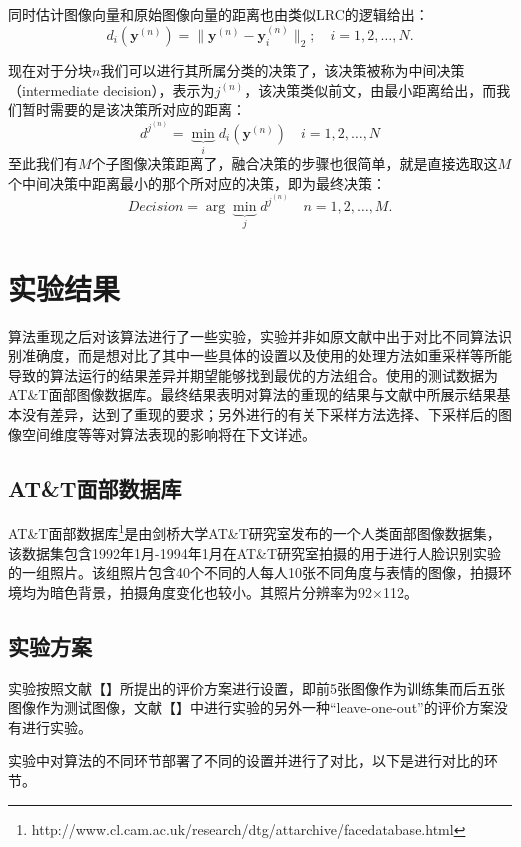 \documentclass[UTF8]{ctexart}
\begin{document}
\par
同时估计图像向量和原始图像向量的距离也由类似LRC的逻辑给出：
\begin{equation}
    d_i(\mathbf{y}^{(n)})=\|\mathbf{y}^{(n)}-\mathbf{y}^{(n)}_i\|_2;\quad i=1,2,\dots,N.
\end{equation}
\par
现在对于分块\(n\)我们可以进行其所属分类的决策了，该决策被称为中间决策（intermediate decision），表示为\(j^{(n)}\)，该决策类似前文，由最小距离给出，而我们暂时需要的是该决策所对应的距离：
\begin{equation}
    d^{j^{(n)}}=\underbrace{\min}_i d_i(\mathbf{y}^{(n)})\quad i=1,2,\dots,N
\end{equation}
至此我们有\(M\)个子图像决策距离了，融合决策的步骤也很简单，就是直接选取这\(M\)个中间决策中距离最小的那个所对应的决策，即为最终决策：
\begin{equation}
    Decision=\arg{\underbrace{\min}_j}d^{j^{(n)}}\quad n=1,2,\dots,M.
\end{equation}
\section{实验结果}\label{sec-3}
算法重现之后对该算法进行了一些实验，实验并非如原文献中出于对比不同算法识别准确度，而是想对比了其中一些具体的设置以及使用的处理方法如重采样等所能导致的算法运行的结果差异并期望能够找到最优的方法组合。使用的测试数据为AT\&T面部图像数据库。最终结果表明对算法的重现的结果与文献中所展示结果基本没有差异，达到了重现的要求；另外进行的有关下采样方法选择、下采样后的图像空间维度等等对算法表现的影响将在下文详述。
\subsection{AT\&T面部数据库}
AT\&T面部数据库\footnote{http://www.cl.cam.ac.uk/research/dtg/attarchive/facedatabase.html}是由剑桥大学AT\&T研究室发布的一个人类面部图像数据集，该数据集包含1992年1月-1994年1月在AT\&T研究室拍摄的用于进行人脸识别实验的一组照片。该组照片包含40个不同的人每人10张不同角度与表情的图像，拍摄环境均为暗色背景，拍摄角度变化也较小。其照片分辨率为92\(\times\)112。
\subsection{实验方案}
实验按照文献【】所提出的评价方案进行设置，即前5张图像作为训练集而后五张图像作为测试图像，文献【】中进行实验的另外一种“leave-one-out”的评价方案没有进行实验。\par
实验中对算法的不同环节部署了不同的设置并进行了对比，以下是进行对比的环节。
\end{document}
